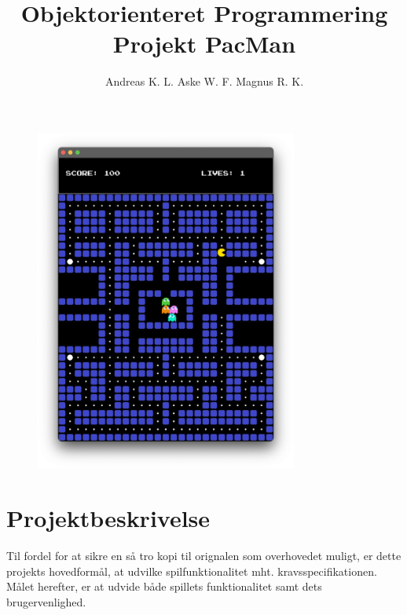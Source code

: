 \documentclass{article}
\title{\textbf{Objektorienteret Programmering Projekt PacMan}}
\author{Andreas K. L. \quad Aske W. F. \quad Magnus R. K.}
\theoremstyle{mytheoremstyle}
\theoremstyle{mytheoremstyle}
\theoremstyle{myproblemstyle}
\begin{document}
\begin{titlepage}
    \maketitle
    \begin{figure}[H]
        \begin{center}
            \includegraphics[width=0.77\textwidth]{figures/FrontPageImage.png}
        \end{center}
    \end{figure}
\end{titlepage}
    \clearpage
    \newpage
    \setcounter{page}{1}

    \pagestyle{fancy}

    \tableofcontents
    \newpage
\section{Projektbeskrivelse}\label{sec:Beskrivelse} %

Til fordel for at sikre en så tro kopi til orignalen som overhovedet muligt, er dette projekts hovedformål, at udvilke spilfunktionalitet mht. kravsspecifikationen. Målet herefter, er at udvide både spillets funktionalitet samt dets brugervenlighed.
\end{document}
